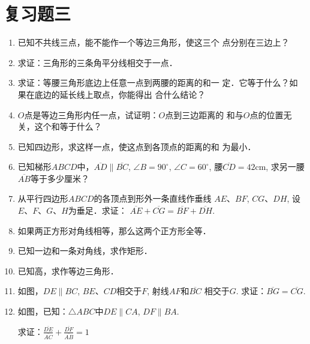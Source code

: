 \section*{复习题三}
\begin{enumerate}
    \item 已知不共线三点，能不能作一个等边三角形，使这三个
    点分别在三边上？
    \item 求证：三角形的三条角平分线相交于一点．
    \item 求证：等腰三角形底边上任意一点到两腰的距离的和一
    定．它等于什么？如果在底边的延长线上取点，你能得出
    合什么结论？
    \item $O$点是等边三角形内任一点，试证明：$O$点到三边距离的
    和与$O$点的位置无关，这个和等于什么？
    \item 已知四边形，求这样一点，使这点到各顶点的距离的和
    为最小．
    \item 已知梯形$ABCD$中，$\overline{AD}\parallel\overline{BC}$, $\angle B=90^{\circ}$, 
    $\angle C=60^{\circ}$, 腰$\overline{CD}=42$cm, 求另一腰$\overline{AB}$等于多少厘米？
    \item 从平行四边形$ABCD$的各顶点到形外一条直线作垂线
    $AE$、$BF$, $CG$、$DH$, 设$E$、$F$、$G$、$H$为垂足．求证：
    $\overline{AE}+\overline{CG}=\overline{BF}+\overline{DH}$.
    \item 如果两正方形对角线相等，那么这两个正方形全等．
\item 已知一边和一条对角线，求作矩形．
\item 已知高，求作等边三角形．
\item 如图，$DE\parallel BC$, $BE$、$CD$相交于$F$, 射线$AF$和$\overline{BC}$
相交于$G$. 求证：$\overline{BG}=\overline{CG}$.
\item 如图，已知：$\triangle ABC$中$DE\parallel CA$, $DF\parallel BA$.

求证：$\frac{\overline{DE}}{\overline{AC}}+\frac{\overline{DF}}{\overline{AB}}=1$


\end{enumerate}
